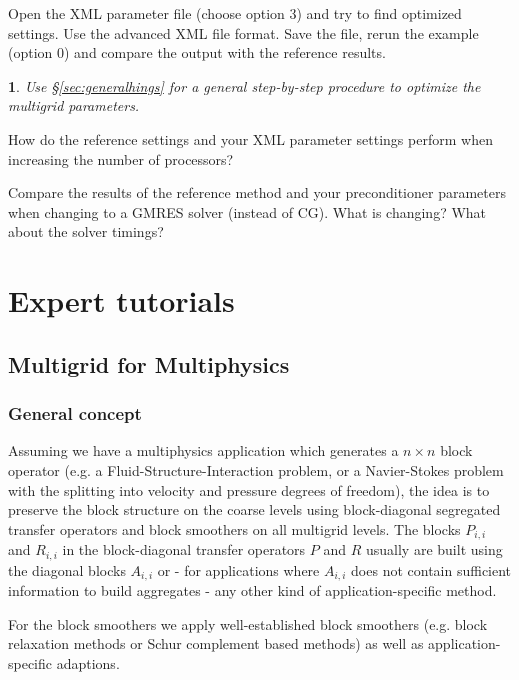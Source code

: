 \documentclass[10pt,fleqn]{book}
\newtheorem*{mycomment}{\ding{42}}
\begin{document}
\begin{exercise}
Open the XML parameter file (choose option 3) and try to find optimized settings. Use the advanced XML file format. Save the file, rerun the example (option 0) and compare the output with the reference results.
\end{exercise}

\begin{mycomment}
Use \S\ref{sec:generalhings} for a general step-by-step procedure to optimize the multigrid parameters.
\end{mycomment}

\begin{exercise}
How do the reference settings and your XML parameter settings perform when increasing the number of processors?
\end{exercise}

\begin{exercise}
Compare the results of the reference method and your preconditioner parameters when changing to a GMRES solver (instead of CG). What is changing? What about the solver timings?
\end{exercise}


\part{Expert tutorials}

\chapter{Multigrid for Multiphysics}

\section{General concept}
Assuming we have a multiphysics application which generates a $n\times n$ block operator (e.g. a Fluid-Structure-Interaction problem, or a Navier-Stokes problem with the splitting into velocity and pressure degrees of freedom), the idea is to preserve the block structure on the coarse levels using block-diagonal segregated transfer operators and block smoothers on all multigrid levels.
The blocks $P_{i,i}$ and $R_{i,i}$ in the block-diagonal transfer operators $P$ and $R$ usually are built using the diagonal blocks $A_{i,i}$ or - for applications where $A_{i,i}$ does not contain sufficient information to build aggregates - any other kind of application-specific method.

For the block smoothers we apply well-established block smoothers (e.g. block relaxation methods or Schur complement based methods) as well as application-specific adaptions.
\end{document}

